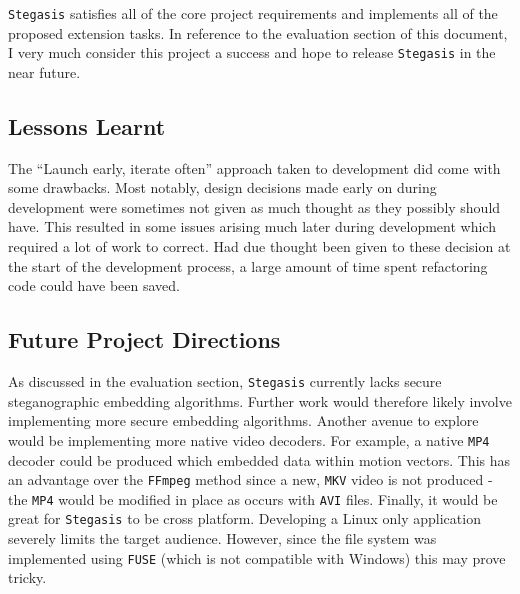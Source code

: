 \documentclass[paper=a4, fontsize=11pt,twoside]{scrartcl}
\numberwithin{table}{section}
\numberwithin{figure}{section}
\numberwithin{algorithm}{section}
\begin{document}
\texttt{Stegasis} satisfies all of the core project requirements and implements all of the proposed extension tasks. In reference to the evaluation section of this document, I very much consider this project a success and hope to release \texttt{Stegasis} in the near future.

\subsection{Lessons Learnt}

The ``Launch early, iterate often'' approach taken to development did come with some drawbacks. Most notably, design decisions made early on during development were sometimes not given as much thought as they possibly should have. This resulted in some issues arising much later during development which required a lot of work to correct. Had due thought been given to these decision at the start of the development process, a large amount of time spent refactoring code could have been saved. 

\subsection{Future Project Directions}

As discussed in the evaluation section, \texttt{Stegasis} currently lacks secure steganographic embedding algorithms. Further work would therefore likely involve implementing more secure embedding algorithms. Another avenue to explore would be implementing more native video decoders. For example, a native \texttt{MP4} decoder could be produced which embedded data within motion vectors. This has an advantage over the \texttt{FFmpeg} method since a new, \texttt{MKV} video is not produced - the \texttt{MP4} would be modified in place as occurs with \texttt{AVI} files.
Finally, it would be great for \texttt{Stegasis} to be cross platform. Developing a Linux only application severely limits the target audience. However, since the file system was implemented using \texttt{FUSE} (which is not compatible with Windows) this may prove tricky.

\vfill

\pagebreak
\end{document}
